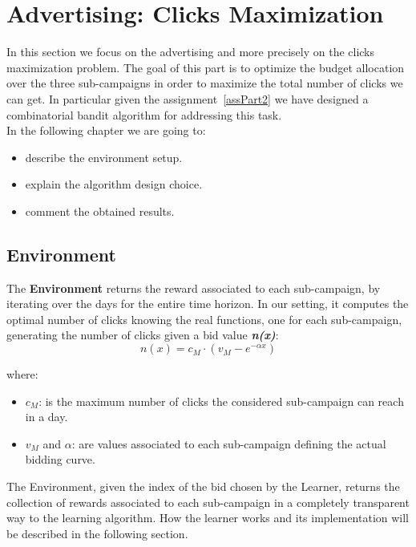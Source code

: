 \chapter{Advertising: Clicks Maximization}

In this section we focus on the advertising and more precisely on the clicks maximization problem.
The goal of this part is to optimize the budget allocation over the three sub-campaigns in order to maximize the total number of clicks we can get.
In particular given the assignment~\ref{assPart2} we have designed a combinatorial bandit algorithm for addressing this task.\\
In the following chapter we are going to:
\begin{itemize}
	\item describe the environment setup.
	\item explain the algorithm design choice.
	\item comment the obtained results.
\end{itemize}

\section{Environment}
The \textbf{Environment} returns the reward associated to each sub-campaign, by iterating over the days for the entire time horizon.
In our setting, it computes the optimal number of clicks knowing the real functions, one for each sub-campaign, generating  the number of clicks given a bid value \textbf{\textit{n(x)}}:\\

\begin{equation}
	n(x) = c_{M} \cdot (v_{M} - e^{-\alpha x})
\end{equation}

where:
\begin{itemize}
	\item $c_{M}$: is the maximum number of clicks the considered sub-campaign can reach in a day.
	\item $v_{M}$ and $\alpha$: are values associated to each sub-campaign defining the actual bidding curve.
\end{itemize}


The Environment, given the index of the bid chosen by the Learner, returns the collection of rewards associated to each sub-campaign in a completely transparent way to the learning algorithm.
How the learner works and its implementation will be described in the following section.



